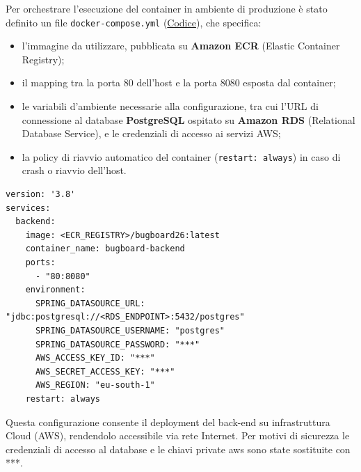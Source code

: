 \documentclass[a4paper,12pt]{article}
\begin{document}
Per orchestrare l'esecuzione del container in ambiente di produzione è stato definito un file \texttt{docker-compose.yml} (\hyperref[lst:dockercompose]{Codice}), che specifica:
\begin{itemize}
    \item l'immagine da utilizzare, pubblicata su \textbf{Amazon ECR} (Elastic Container Registry);
    \item il mapping tra la porta 80 dell'host e la porta 8080 esposta dal container;
    \item le variabili d'ambiente necessarie alla configurazione, tra cui l'URL di connessione al database \textbf{PostgreSQL} ospitato su \textbf{Amazon RDS} (Relational Database Service), e le credenziali di accesso ai servizi AWS;  
    \item la policy di riavvio automatico del container (\texttt{restart: always}) in caso di crash o riavvio dell'host.
\end{itemize}

\begin{lstlisting}[caption={Docker Compose per il deployment del back-end}, label={lst:dockercompose}]
version: '3.8'
services:
  backend:
    image: <ECR_REGISTRY>/bugboard26:latest
    container_name: bugboard-backend
    ports:
      - "80:8080"
    environment:
      SPRING_DATASOURCE_URL: "jdbc:postgresql://<RDS_ENDPOINT>:5432/postgres"
      SPRING_DATASOURCE_USERNAME: "postgres"
      SPRING_DATASOURCE_PASSWORD: "***"
      AWS_ACCESS_KEY_ID: "***"
      AWS_SECRET_ACCESS_KEY: "***"
      AWS_REGION: "eu-south-1"
    restart: always
\end{lstlisting}

Questa configurazione consente il deployment del back-end su infrastruttura Cloud (AWS), rendendolo accessibile via rete Internet. Per motivi di sicurezza le credenziali di accesso al database e le chiavi private aws sono state sostituite con ***.
\end{document}
